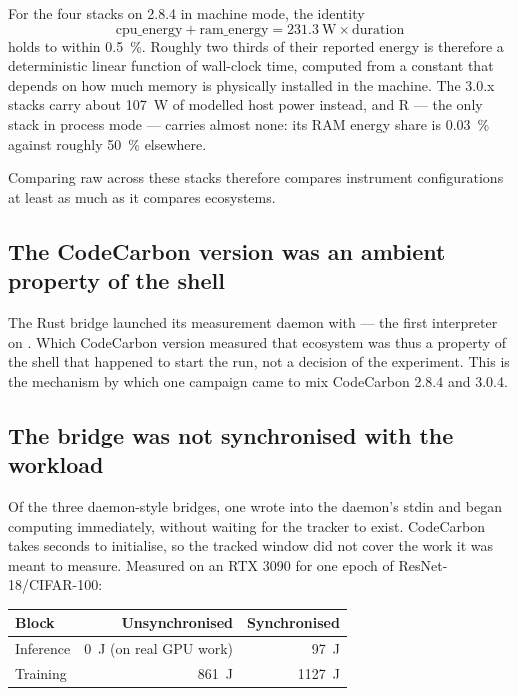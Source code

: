 For the four stacks on 2.8.4 in machine mode, the identity
\[
\text{cpu\_energy} + \text{ram\_energy} = \SI{231.3}{\watt}\times \text{duration}
\]
holds to within \SI{0.5}{\percent}. Roughly two thirds of their reported energy
is therefore a deterministic linear function of wall-clock time, computed from a
constant that depends on how much memory is physically installed in the machine.
The 3.0.x stacks carry about \SI{107}{\watt} of modelled host power instead, and
R --- the only stack in process mode --- carries almost none: its RAM energy
share is \SI{0.03}{\percent} against roughly \SI{50}{\percent} elsewhere.

Comparing raw  across these stacks therefore compares
instrument configurations at least as much as it compares ecosystems.

\subsection{The CodeCarbon version was an ambient property of the shell}

The Rust bridge launched its measurement daemon with 
--- the first interpreter on . Which CodeCarbon version measured that
ecosystem was thus a property of the shell that happened to start the run, not a
decision of the experiment. This is the mechanism by which one campaign came to
mix CodeCarbon 2.8.4 and 3.0.4.

\subsection{The bridge was not synchronised with the workload}

Of the three daemon-style bridges, one wrote  into the daemon's stdin
and began computing immediately, without waiting for the tracker to exist.
CodeCarbon takes seconds to initialise, so the tracked window did not cover the
work it was meant to measure. Measured on an RTX 3090 for one epoch of
ResNet-18/CIFAR-100:

\begin{center}
\small
\begin{tabular}{lrr}
\toprule
Block & Unsynchronised & Synchronised \\
\midrule
Inference & \SI{0}{\joule} (on real GPU work) & \SI{97}{\joule} \\
Training  & \SI{861}{\joule} & \SI{1127}{\joule} \\
\bottomrule
\end{tabular}
\end{center}

